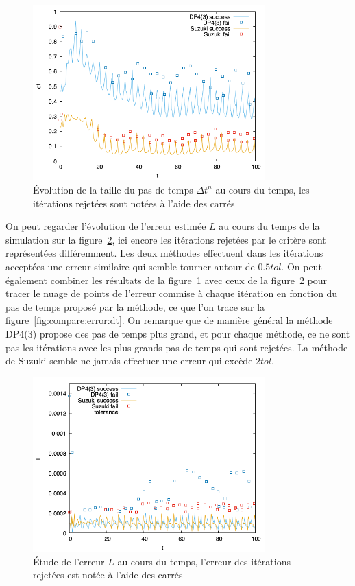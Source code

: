 \begin{figure}[h]
  \centering
  \includegraphics[width=0.8\textwidth]{img/compare_dt.png}
  \caption{Évolution de la taille du pas de temps $\Delta t^n$ au cours du temps, les itérations rejetées sont notées à l'aide des carrés}
  \label{fig:compare:dt}
\end{figure}

On peut regarder l'évolution de l'erreur estimée $L$ au cours du temps de la simulation sur la figure~\ref{fig:compare:error_dtt}, ici encore les itérations rejetées par le critère sont représentées différemment. Les deux méthodes effectuent dans les itérations acceptées une erreur similaire qui semble tourner autour de $0.5 tol$. On peut également combiner les résultats de la figure~\ref{fig:compare:dt} avec ceux de la figure~\ref{fig:compare:error_dtt} pour tracer le nuage de points de l'erreur commise à chaque itération en fonction du pas de temps proposé par la méthode, ce que l'on trace sur la figure~\ref{fig:compare:error:dt}. On remarque que de manière général la méthode DP4(3) propose des pas de temps plus grand, et pour chaque méthode, ce ne sont pas les itérations avec les plus grands pas de temps qui sont rejetées. La méthode de Suzuki semble ne jamais effectuer une erreur qui excède $2tol$.

\begin{figure}[h]
  \centering
  \includegraphics[width=0.8\textwidth]{img/compare_error_dtt.png}
  \caption{Étude de l'erreur $L$ au cours du temps, l'erreur des itérations rejetées est notée à l'aide des carrés}
  \label{fig:compare:error_dtt}
\end{figure}

